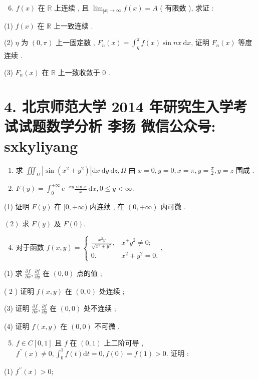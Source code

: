 \documentclass[10pt]{article}
\begin{document}
{\begin{enumerate}
  \setcounter{enumi}{5}
  \item $f(x)$  在  $\mathbb{R}$  上连续 ,  且  $\lim _{|x| \rightarrow \infty} f(x)=A$ ( 有限数 ),  求证 :
\end{enumerate}
(1) $f(x)$  在  $\mathbb{R}$  上一致连续 .

(2) $\eta$  为  $(0, \pi)$  上一固定数 , $F_{n}(x)=\int_{\eta}^{\pi} f(x) \sin n x \mathrm{~d} x$,  证明  $F_{n}(x)$  等度连续 .

(3) $F_{n}(x)$  在  $\mathbb{R}$  上一致收敛于  0 .

\section{4. 北京师范大学 2014 年研究生入学考试试题数学分析 
 李扬 
 微信公众号: sxkyliyang}
\begin{enumerate}
  \item  求  $\iiint_{\Omega}\left|\sin \left(x^{2}+y^{2}\right)\right| \mathrm{d} x \mathrm{~d} y \mathrm{~d} z, \Omega$  由  $x=0, y=0, x=\pi, y=\frac{\pi}{2}, y=z$  围成 .

  \item $F(y)=\int_{0}^{+\infty} e^{-x y} \frac{\sin x}{x} \mathrm{~d} x, 0 \leqslant y<\infty$.

\end{enumerate}
(1)  证明  $F(y)$  在  $[0,+\infty)$  内连续 ,  在  $(0,+\infty)$  内可微 .

$(2)$  求  $F(y)$  及  $F(0)$.

\begin{enumerate}
  \setcounter{enumi}{3}
  \item  对于函数  $f(x, y)=\left\{\begin{array}{ll}\frac{x^{2} y}{\sqrt{x^{2}+y^{2}}}, & x^{+} y^{2} \neq 0 ; \\ 0 . & x^{2}+y^{2}=0 .\end{array}\right.$,
\end{enumerate}
(1)  求  $\frac{\partial f}{\partial x}, \frac{\partial f}{\partial y}$  在  $(0,0)$  点的值 ;

( 2 )  证明  $f(x, y)$  在  $(0,0)$  处连续 ;

(3)  证明  $\frac{\partial f}{\partial x}, \frac{\partial f}{\partial y}$  在  $(0,0)$  处不连续 ;

(4)  证明  $f(x, y)$  在  $(0,0)$  不可微 .

\begin{enumerate}
  \setcounter{enumi}{4}
  \item $f \in C[0,1]$  且  $f$  在  $(0,1)$  上二阶可导 , $f^{\prime \prime}(x) \neq 0, \int_{0}^{1} f(t) \mathrm{d} t=0, f(0)=f(1)>0$.  证明 :
\end{enumerate}
(1) $f^{\prime \prime}(x)>0$;

}
\end{document}
